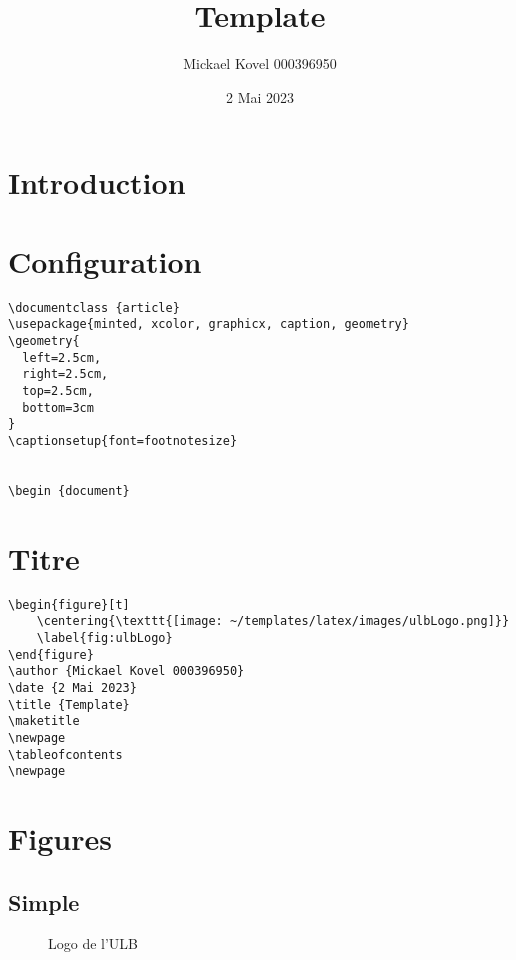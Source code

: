 \documentclass {article}
\begin{document}
\begin{figure}[t]
	\label{fig:ulbLogo}
\end{figure}
\author {Mickael Kovel 000396950}
\date {2 Mai 2023}
\title {Template}
\maketitle
\newpage
\tableofcontents
\newpage


\section {Introduction}

\section {Configuration}

\begin{verbatim}
\documentclass {article}
\usepackage{minted, xcolor, graphicx, caption, geometry}
\geometry{
  left=2.5cm,
  right=2.5cm,
  top=2.5cm,
  bottom=3cm
}
\captionsetup{font=footnotesize}


\begin {document}
\end{verbatim}
\section {Titre}

\begin{verbatim}
\begin{figure}[t]
    \centering{\texttt{[image: ~/templates/latex/images/ulbLogo.png]}}
	\label{fig:ulbLogo}
\end{figure}
\author {Mickael Kovel 000396950}
\date {2 Mai 2023}
\title {Template}
\maketitle
\newpage
\tableofcontents
\newpage
\end{verbatim}


\newpage
\section {Figures}
\subsection {Simple}
\begin{figure}[h]
	\caption{Logo de l'ULB}
	\label{fig:ulbLogo}
\end{figure}
\end{document}
